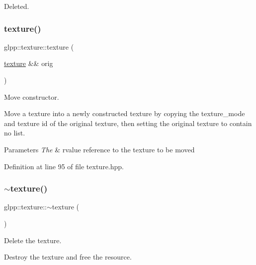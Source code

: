 Deleted. \mbox{\label{classglpp_1_1texture_a4b45a7d9c58d84913ec37f416ef766b5}} 
\subsubsection{\texorpdfstring{texture()}{texture()}\hspace{0.1cm}{\footnotesize\ttfamily [4/4]}}
{\footnotesize\ttfamily glpp\+::texture\+::texture (\begin{DoxyParamCaption}\item[{\hyperlink{classglpp_1_1texture}{texture} \&\&}]{orig }\end{DoxyParamCaption})\hspace{0.3cm}{\ttfamily [inline]}}



Move constructor. 

Move a texture into a newly constructed texture by copying the texture\+\_\+mode and texture id of the original texture, then setting the original texture to contain no list.


\begin{DoxyParams}{Parameters}
{\em The} & rvalue reference to the texture to be moved \\
\hline
\end{DoxyParams}


Definition at line 95 of file texture.\+hpp.

\mbox{\label{classglpp_1_1texture_a45a7e6426cde8199f0507c7618d2188e}} 
\subsubsection{\texorpdfstring{$\sim$texture()}{~texture()}}
{\footnotesize\ttfamily glpp\+::texture\+::$\sim$texture (\begin{DoxyParamCaption}{ }\end{DoxyParamCaption})\hspace{0.3cm}{\ttfamily [noexcept]}}



Delete the texture. 

Destroy the texture and free the resource. 

